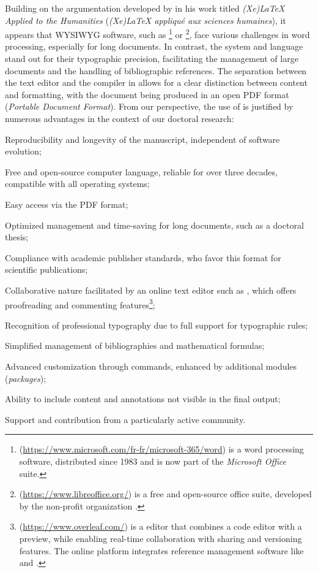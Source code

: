 Building on the argumentation developed by \textcolor{blue}{\textcite[8-9]{rouquette_xelatex_2012}} in his work titled \textsl{(Xe)LaTeX Applied to the Humanities} (\textsl{(Xe)LaTeX appliqué aux sciences humaines}), it appears that \acrfull{WYSIWYG} software, such as \footnote{
     (\url{https://www.microsoft.com/fr-fr/microsoft-365/word}) is a word processing software, distributed since 1983 and is now part of the \textsl{Microsoft Office} suite.
} or \footnote{
     (\url{https://www.libreoffice.org/}) is a free and open-source office suite, developed by the non-profit organization .
}, face various challenges in word processing, especially for long documents. In contrast, the \latexword{\LaTeX} system and language stand out for their typographic precision, facilitating the management of large documents and the handling of bibliographic references. The separation between the text editor and the compiler in \latexword{\LaTeX} allows for a clear distinction between content and formatting, with the document being produced in an open PDF format (\textsl{Portable Document Format}). From our perspective, the use of \latexword{\LaTeX} is justified by numerous advantages in the context of our doctoral research:
    \begin{customitemize}
\item Reproducibility and longevity of the manuscript, independent of software evolution;
\item Free and open-source computer language, reliable for over three decades, compatible with all operating systems;
\item Easy access via the PDF format;
\item Optimized management and time-saving for long documents, such as a doctoral thesis;
\item Compliance with academic publisher standards, who favor this format for scientific publications;
\item Collaborative nature facilitated by an online text editor such as , which offers proofreading and commenting features\footnote{
     (\url{https://www.overleaf.com/}) is a \latexword{\LaTeX} editor that combines a code editor with a preview, while enabling real-time collaboration with sharing and versioning features. The online platform integrates reference management software like  and .
};
\item Recognition of professional typography due to full support for typographic rules;
\item Simplified management of bibliographies and mathematical formulas;
\item Advanced customization through commands, enhanced by additional modules (\textsl{packages});
\item Ability to include content and annotations not visible in the final output;
\item Support and contribution from a particularly active \latexword{\LaTeX} community.
    \end{customitemize}%

